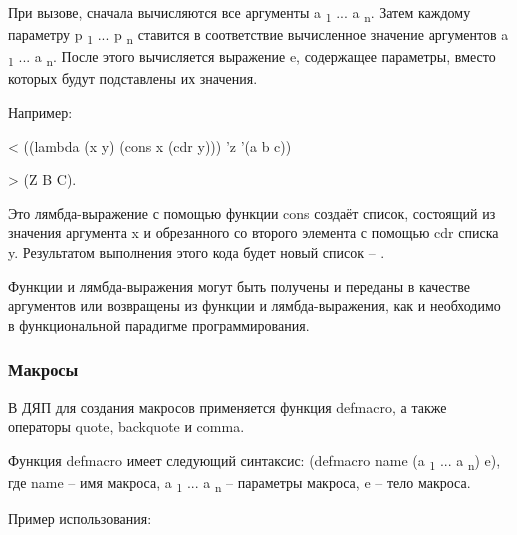При вызове, сначала вычисляются все аргументы a \textsubscript 1 ... a \textsubscript n. Затем каждому параметру p \textsubscript 1 ... p \textsubscript n ставится в соответствие вычисленное значение аргументов a \textsubscript 1 ... a \textsubscript n. После этого вычисляется выражение e, содержащее параметры, вместо которых будут подставлены их значения.

Например:

< ((lambda (x y) (cons x (cdr y))) 'z '(a b c))

> (Z B C).

Это лямбда-выражение с помощью функции cons создаёт список, состоящий из значения аргумента x и обрезанного со второго элемента с помощью cdr списка y. Результатом выполнения этого кода будет новый список -- .

Функции и лямбда-выражения могут быть получены и переданы в качестве аргументов или возвращены из функции и лямбда-выражения, как и необходимо в функциональной парадигме программирования.


\subsubsection{Макросы}

В ДЯП для создания макросов применяется функция defmacro, а также операторы quote, backquote и comma.

Функция defmacro имеет следующий синтаксис:
(defmacro name (a \textsubscript 1 ... a \textsubscript n) e), где name -- имя макроса, a \textsubscript 1 ... a \textsubscript n -- параметры макроса, e -- тело макроса.

Пример использования:

